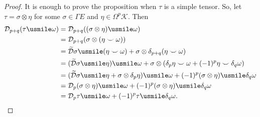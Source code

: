 \begin{proof}
  It is enough to prove the proposition when $\tau$ is a simple tensor.
  So, let $\tau = \sigma \otimes \eta$
  for some $\sigma \in \Gamma E$ and $\eta \in \Omega^p \mathcal{K}$.
  Then
  \begin{equation}
    \begin{split}
      \mathcal{D}_{p + q}(\tau \usmile \omega)
      & = \mathcal{D}_{p + q}((\sigma \otimes \eta) \usmile \omega) \\
      & = \mathcal{D}_{p + q}(\sigma \otimes (\eta \smile \omega)) \\
      & = \widetilde{\mathcal{D}} \sigma \usmile (\eta \smile \omega)
          + \sigma \otimes \delta_{p + q}(\eta \smile \omega) \\
      & = (\widetilde{\mathcal{D}} \sigma \usmile \eta) \usmile \omega
          + \sigma \otimes
          (\delta_p \eta \smile \omega + (-1)^p \eta \smile \delta_q \omega) \\
      & = ( \widetilde{\mathcal{D}} \sigma \usmile \eta
            + \sigma \otimes \delta_p \eta)
          \usmile \omega
          + (-1)^p (\sigma \otimes \eta) \usmile \delta_q \omega \\
      & = \mathcal{D}_p(\sigma \otimes \eta) \usmile \omega
          + (-1)^p (\sigma \otimes \eta) \usmile \delta_q \omega \\
      & = \mathcal{D}_p \tau \usmile \omega
          + (-1)^p \tau \usmile \delta_q \omega. \qedhere
    \end{split}
  \end{equation}
\end{proof}
